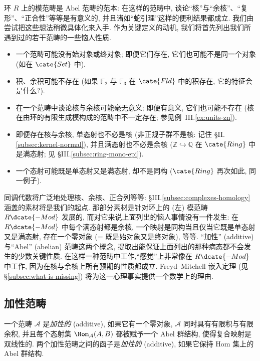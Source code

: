 环 $R$ 上的模范畴是 Abel 范畴的范本: 在这样的范畴中, 谈论``核''与``余核''、``复形''、``正合性''等等是有意义的, 并且诸如``蛇引理''这样的便利结果都成立. 我们由尝试把这些想法稍微具体化来入手.
作为关键定义的动机, 我们将首先列出我们所遇到过的若干范畴的一些恼人性质.
\begin{itemize}
\item 一个范畴可能没有始对象或终对象; 即便它们存在, 它们也可能不是同一个对象 (如在 $\cate{Set}$ 中).
\item 积、余积可能不存在 (如果 $\mathbb{F}_2$ 与 $\mathbb{F}_3$ 在 $\cate{Fld}$ 中的积存在, 它的特征会是什么?).
\item 在一个范畴中谈论核与余核可能毫无意义; 即便有意义, 它们也可能不存在 (核在由环的有限生成模构成的范畴中不一定存在; 参见例~III.\ref{ex:units-zn}).
\item 即便存在核与余核, 单态射也不必是核 (非正规子群不是核: 记住 §II.\ref{subsec:kernel-normal}), 并且满态射也不必是余核 ($\mathbb{Z}\hookrightarrow\mathbb{Q}$ 在 $\cate{Ring}$ 中是满态射; 见 §III.\ref{subsec:ring-mono-epi}).
\item 一个态射可能既是单态射又是满态射, 却不是同构 ($\cate{Ring}$ 再次如此, 同一例子).
\end{itemize}
\indent 同调代数将广泛地处理核、余核、正合列等等: §III.\ref{subsec:complexes-homology} 涵盖的素材将是我们的起点. 那部分素材是针对环上的 (左) 模范畴 $R\dcate{-Mod}$ 发展的, 而对它来说上面列出的恼人事情没有一件发生: 在 $R\dcate{-Mod}$ 中每个满态射都是余核, 一个映射是同构当且仅当它既是单态射又是满态射, 存在一个零对象 (= 既是始对象又是终对象), 等等.
``加性'' (additive) 与``Abel'' (abelian) 范畴这两个概念, 提取出能保证上面列出的那种病态都不会发生的少数关键性质. 在这样一种范畴中工作,``感觉''上非常像在 $R\dcate{-Mod}$ 中工作, 因为在核与余核上所有预期的性质都成立. Freyd–Mitchell 嵌入定理 (见 \S\ref{subsec:what-is-missing}) 将为这一心理事实提供一个数学上的理由.

\subsection{加性范畴}
\label{subsec:additive-categories}

\begin{definition}\label{def:additive-category}
一个范畴 $\mathcal{A}$ 是\emph{加性的} (additive), 如果它有一个零对象, $\mathcal{A}$ 同时具有有限积与有限余积, 并且每个态射集 $\Hom_{\mathcal{A}}(A,B)$ 都被赋予一个 Abel 群结构, 使得复合映射是双线性的. 两个加性范畴之间的函子是\emph{加性的} (additive), 如果它保持 Hom 集上的 Abel 群结构.
\end{definition}

